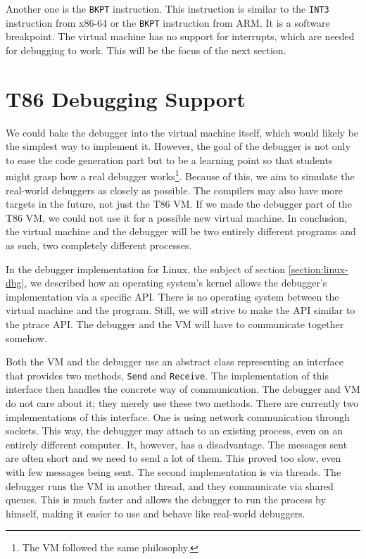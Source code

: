 Another one is the \texttt{BKPT} instruction. This instruction is similar to
the \texttt{INT3} instruction from x86-64 or the \texttt{BKPT} instruction from
ARM. It is a software breakpoint. The virtual machine has no support for
interrupts, which are needed for debugging to work. This will be the focus of
the next section.

\section{T86 Debugging Support}
We could bake the debugger into the virtual machine itself, which would likely
be the simplest way to implement it. However, the goal of the debugger is not
only to ease the code generation part but to be a learning point so that
students might grasp how a real debugger works\footnote{The VM followed the
same philosophy.}. Because of this, we aim to simulate the real-world debuggers
as closely as possible. The compilers may also have more targets in the future,
not just the T86 VM. If we made the debugger part of the T86 VM, we could not
use it for a possible new virtual machine. In conclusion, the virtual machine
and the debugger will be two entirely different programs and as such, two
completely different processes.

In the debugger implementation for Linux, the subject of section
\ref{section:linux-dbg}, we described how an operating system's kernel allows
the debugger's implementation via a specific API. There is no operating system
between the virtual machine and the program. Still, we will strive to make the
API similar to the ptrace API. The debugger and the VM will have to communicate
together somehow.

Both the VM and the debugger use an abstract class representing an interface
that provides two methods, \texttt{Send} and \texttt{Receive}. The
implementation of this interface then handles the concrete way of
communication. The debugger and VM do not care about it; they merely use these
two methods. There are currently two implementations of this interface. One is
using network communication through sockets. This way, the debugger may attach
to an existing process, even on an entirely different computer. It, however,
has a disadvantage. The messages sent are often short and we need to send a lot
of them. This proved too slow, even with few messages being sent. The second
implementation is via threads. The debugger runs the VM in another thread, and
they communicate via shared queues. This is much faster and allows the debugger
to run the process by himself, making it easier to use and behave like
real-world debuggers.


